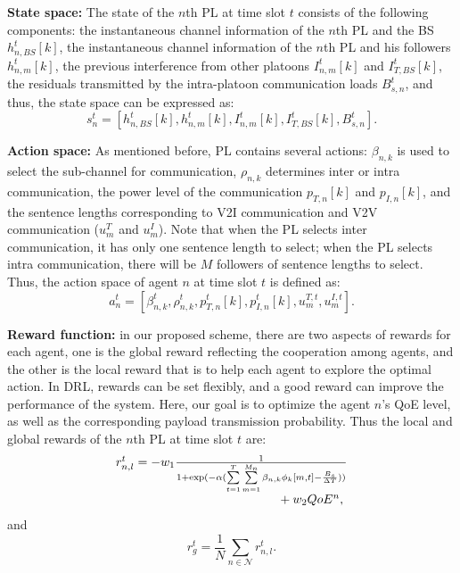 \documentclass[10pt, lettersize,journal]{IEEEtran}
\begin{document}
	\textbf{State space:} The state of the $n$th PL at time slot $t$ consists of the following components: the instantaneous channel information of the $n$th PL and the BS $h_{n, BS}^t[k]$, the instantaneous channel information of the $n$th PL and his followers $h_{n,m}^t[k]$, the previous interference from other platoons $I_{n,m}^t[k]$ and $I_{T,BS}^t[k]$, the residuals transmitted by the intra-platoon communication loads $B_{s,n}^t$, and thus, the state space can be expressed as:
	\begin{equation}
		s_n^t = \left[ h_{n, BS}^t[k], h_{n,m}^t[k], I_{n,m}^t[k], I_{T,BS}^t[k], B_{s,n}^t \right].
	\end{equation}
	
	\textbf{Action space:} As mentioned before, PL contains several actions: $\beta_{n,k}$ is used to select the sub-channel for communication, $\rho_{n,k}$ determines inter or intra communication, the power level of the communication $p_{T,n}[k]$ and $p_{I, n}[k]$, and the sentence lengths corresponding to V2I communication and V2V communication ($u_m^T$ and $u_m^I$). Note that when the PL selects inter communication, it has only one sentence length to select; when the PL selects intra communication, there will be $M$ followers of sentence lengths to select. Thus, the action space of agent $n$ at time slot $t$ is defined as:
	\begin{equation}
		a_n^t = \left[ \beta_{n,k}^t, \rho_{n,k}^t, p_{T,n}^t[k], p_{I, n}^t[k], u_m^{T,t}, u_m^{I,t} \right].
	\end{equation}
	
	\textbf{Reward function:} in our proposed scheme, there are two aspects of rewards for each agent, one is the global reward reflecting the cooperation among agents, and the other is the local reward that is to help each agent to explore the optimal action.
	In DRL, rewards can be set flexibly, and a good reward can improve the performance of the system. Here, our goal is to optimize the agent $n$'s QoE level, as well as the corresponding payload transmission probability. Thus the local and global rewards of the $n$th PL at time slot $t$ are:
	\begin{equation}\label{eq20}
		\begin{array}{l}
			{r_{n,l}^{t}} =  - {w_1}\frac{1}{{1 + \exp ( - \alpha (\sum\limits_{t = 1}^T {\sum\limits_{m = 1}^{M_{n}} {{\beta _{n,k}}} } \phi _k[m,t] - \frac{{{B_s}}}{{\Delta T}}))}}\\
			{\rm{        }} \qquad\qquad\qquad\qquad\qquad\qquad\quad+ {w_2}Qo{E^n},
		\end{array}
	\end{equation}
	and \begin{equation}\label{eq21}
		{r_{g}^{t}} = \frac{1}{N}\sum\limits_{n \in \mathcal N} {{r_{n,l}^{t}}}.
	\end{equation}
	
\end{document}
